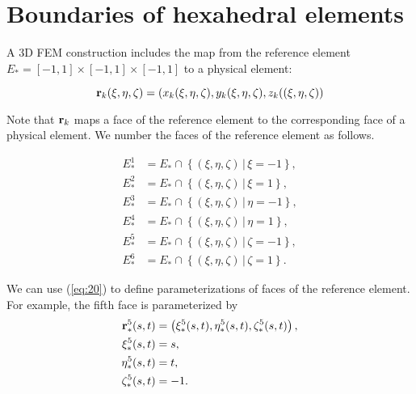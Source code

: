 \documentclass[11pt]{article}
\begin{document}
\section{Boundaries of hexahedral elements}
\label{sec-4}

A 3D FEM construction includes the map from the reference element
$E_{*} = [-1, 1] \times [-1,1] \times [-1,1]$ to a physical element:

\begin{equation}
\label{eq:19}
\mathbf{r}_{k}(\xi,\eta,\zeta) = \left( x_{k}(\xi,\eta,\zeta), y_{k}(\xi,\eta,\zeta), z_{k}((\xi,\eta,\zeta) \right)
\end{equation}

Note that $\mathbf{r}_{k}$ maps a face of the reference element to the
corresponding face of a physical element. We number the faces of the
reference element as follows.

\begin{equation}
\label{eq:20}
\begin{aligned}
E_{*}^{1} &=  E_{*} \cap \left \{ (\xi, \eta, \zeta)\, |\, \xi = -1 \right \},\\
E_{*}^{2} &=  E_{*} \cap \left \{ (\xi, \eta, \zeta)\, |\, \xi = 1  \right \},\\
E_{*}^{3} &=  E_{*} \cap \left \{ (\xi, \eta, \zeta)\, |\, \eta = -1 \right \},\\
E_{*}^{4} &=  E_{*} \cap \left \{ (\xi, \eta, \zeta)\, |\, \eta = 1  \right \},\\
E_{*}^{5} &=  E_{*} \cap \left \{ (\xi, \eta, \zeta)\, |\, \zeta = -1 \right \},\\
E_{*}^{6} &=  E_{*} \cap \left \{ (\xi, \eta, \zeta)\, |\, \zeta = 1  \right \}.
\end{aligned}
\end{equation}

\renewcommand{\F}[2]{#1_{#2}^{5}}
We can use (\ref{eq:20}) to define parameterizations of faces of the
reference element. For example, the fifth face is parameterized by
\begin{equation}
  \label{eq:35}
  \begin{aligned}
    \Fr{\R}(s,t) &= \left( \Fr{\xi}(s,t), \Fr{\eta}(s,t), \Fr{\zeta}(s,t) \right),\\
    \Fr{\xi}(s,t) &= s,\\
    \Fr{\eta}(s,t) &= t,\\
    \Fr{\zeta}(s,t) &= -1.
  \end{aligned}
\end{equation}
\end{document}
